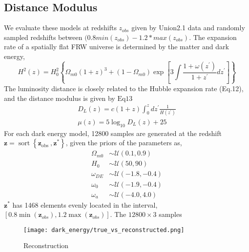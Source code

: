 \subsection{Distance Modulus}
We evaluate these models at redshifts $z_{obs}$ given by Union2.1 data and randomly sampled redshifts between $(0.8 min(z_{obs}) - 1.2 * max(z_{obs})$. The expansion rate of a spatially flat FRW universe is determined by the matter and dark energy,
$$
H^{2}(z)=H_{0}^{2}\left\{\Omega_{m 0}(1+z)^{3}+\left(1-\Omega_{m 0}\right) \exp \left[3 \int \frac{1+\omega\left(z^{\prime}\right)}{1+z^{\prime}} d z^{\prime}\right]\right\}
$$
The luminosity distance is closely related to the Hubble expansion rate (Eq.12), and the distance modulus is given by $\mathrm{Eq} 13$
$$
\begin{gathered}
D_{L}(z)=c(1+z) \int_{0}^{z} d z^{\prime} \frac{1}{H\left(z^{\prime}\right)} \\
\mu(z)=5 \log _{10} D_{L}(z)+25
\end{gathered}
$$
For each dark energy model, 12800 samples are generated at the redshift $\boldsymbol{z}=\operatorname{sort}\left\{\boldsymbol{z}_{\text {obs }}, \boldsymbol{z}^{*}\right\}$, given the priors of the parameters as,
$$
\begin{aligned}
\Omega_{m 0} & \sim \mathcal{U}(0.1,0.9) \\
H_{0} & \sim \mathcal{U}(50,90) \\
\omega_{D E} & \sim \mathcal{U}(-1.8,-0.4) \\
\omega_{0} & \sim \mathcal{U}(-1.9,-0.4) \\
\omega_{a} & \sim \mathcal{U}(-4.0,4.0)
\end{aligned}
$$
$\boldsymbol{z}^{*}$ has 1468 elements evenly located in the interval, $\left[0.8 \min \left(\boldsymbol{z}_{o b s}\right), 1.2 \max \left(\boldsymbol{z}_{o b s}\right)\right]$. The $12800 \times 3$ samples
\begin{figure}
	\centering
	\texttt{[image: dark\_energy/true\_vs\_reconstructed.png]}
	\caption{Reconstruction}
	\label{fig:recon_de}
\end{figure}